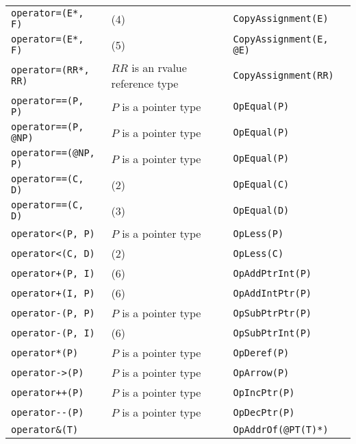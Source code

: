 \documentclass[a4paper,oneside,11pt]{book}
\theoremstyle{definition}
\begin{document}
\begin{flushleft}
\begin{supertabular}{lll}
\verb|operator=(E*, F)|& (4)& \verb|CopyAssignment(E)|\\
\verb|operator=(E*, F)|& (5)& \verb|CopyAssignment(E, @E)|\\
\verb|operator=(RR*, RR)|& $RR$ is an rvalue reference type& \verb|CopyAssignment(RR)|\\
\verb|operator==(P, P)|& $P$ is a pointer type& \verb|OpEqual(P)|\\
\verb|operator==(P, @NP)|& $P$ is a pointer type& \verb|OpEqual(P)|\\
\verb|operator==(@NP, P)|& $P$ is a pointer type& \verb|OpEqual(P)|\\
\verb|operator==(C, D)|& (2)& \verb|OpEqual(C)|\\
\verb|operator==(C, D)|& (3)& \verb|OpEqual(D)|\\
\verb|operator<(P, P)|& $P$ is a pointer type& \verb|OpLess(P)|\\
\verb|operator<(C, D)|& (2)& \verb|OpLess(C)|\\
\verb|operator+(P, I)|& (6)& \verb|OpAddPtrInt(P)|\\
\verb|operator+(I, P)|& (6)& \verb|OpAddIntPtr(P)|\\
\verb|operator-(P, P)|& $P$ is a pointer type& \verb|OpSubPtrPtr(P)|\\
\verb|operator-(P, I)|& (6)& \verb|OpSubPtrInt(P)|\\
\verb|operator*(P)|& $P$ is a pointer type& \verb|OpDeref(P)|\\
\verb|operator->(P)|& $P$ is a pointer type& \verb|OpArrow(P)|\\
\verb|operator++(P)|& $P$ is a pointer type& \verb|OpIncPtr(P)|\\
\verb|operator--(P)|& $P$ is a pointer type& \verb|OpDecPtr(P)|\\
\verb|operator&(T)|& & \verb|OpAddrOf(@PT(T)*)|\\
\hline
\end{supertabular}
\end{flushleft}
\end{document}
